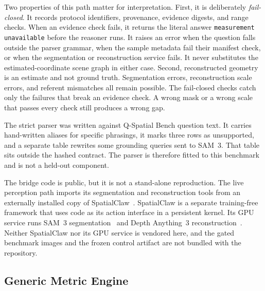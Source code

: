 \documentclass{article}
\begin{document}
Two properties of this path matter for interpretation. First, it is deliberately \emph{fail-closed}. It records protocol identifiers, provenance, evidence digests, and range checks. When an evidence check fails, it returns the literal answer \texttt{measurement unavailable} before the reasoner runs. It raises an error when the question falls outside the parser grammar, when the sample metadata fail their manifest check, or when the segmentation or reconstruction service fails. It never substitutes the estimated-coordinate scene graph in either case. Second, reconstructed geometry is an estimate and not ground truth. Segmentation errors, reconstruction scale errors, and referent mismatches all remain possible. The fail-closed checks catch only the failures that break an evidence check. A wrong mask or a wrong scale that passes every check still produces a wrong gap.

The strict parser was written against Q-Spatial Bench question text. It carries hand-written aliases for specific phrasings, it marks three rows as unsupported, and a separate table rewrites some grounding queries sent to SAM~3. That table sits outside the hashed contract. The parser is therefore fitted to this benchmark and is not a held-out component.

The bridge code is public, but it is not a stand-alone reproduction. The live perception path imports its segmentation and reconstruction tools from an externally installed copy of SpatialClaw~\citep{cho2026spatialclaw}. SpatialClaw is a separate training-free framework that uses code as its action interface in a persistent kernel. Its GPU service runs SAM~3 segmentation~\citep{carion2025sam3} and Depth Anything~3 reconstruction~\citep{lin2025da3}. Neither SpatialClaw nor its GPU service is vendored here, and the gated benchmark images and the frozen control artifact are not bundled with the repository.

\subsection{Generic Metric Engine}
\label{sec:generic}
\end{document}
